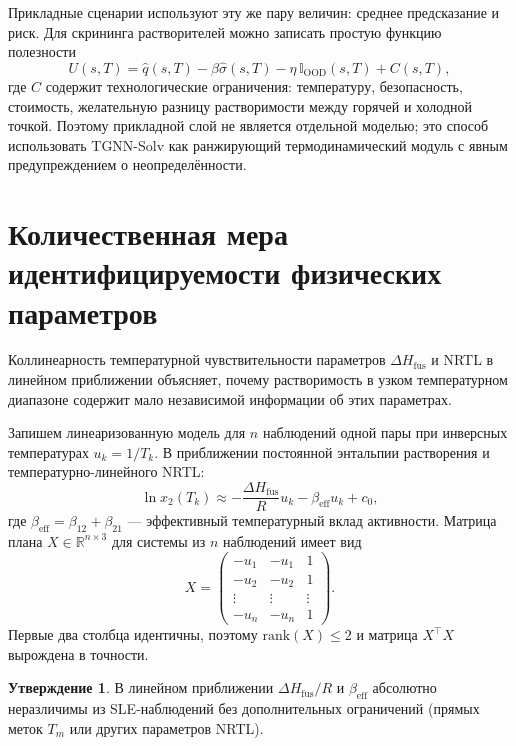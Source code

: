 \documentclass[11pt]{article}
\newcommand{\dHfus}{\Delta H_{\mathrm{fus}}}
\theoremstyle{definition}
\newtheorem{claim}{Утверждение}[section]
\begin{document}
Прикладные сценарии используют эту же пару величин: среднее предсказание и риск. Для скрининга растворителей можно записать простую функцию полезности
\begin{equation*}
    U(s,T)=\hat q(s,T)-\beta\hat\sigma(s,T)-\eta\,\mathbb I_{\mathrm{OOD}}(s,T)+C(s,T),
\end{equation*}
где $C$ содержит технологические ограничения: температуру, безопасность, стоимость, желательную разницу растворимости между горячей и холодной точкой. Поэтому прикладной слой не является отдельной моделью; это способ использовать TGNN-Solv как ранжирующий термодинамический модуль с явным предупреждением о неопределённости.

\section{Количественная мера идентифицируемости физических параметров}
\label{app:identifiability-quantitative}

Коллинеарность температурной чувствительности параметров $\Delta H_{\mathrm{fus}}$ и NRTL в линейном приближении объясняет, почему растворимость в узком температурном диапазоне содержит мало независимой информации об этих параметрах.

Запишем линеаризованную модель для $n$ наблюдений одной пары при инверсных температурах $u_k = 1/T_k$. В приближении постоянной энтальпии растворения и температурно-линейного NRTL:
\begin{equation}
    \ln x_2(T_k) \approx -\frac{\dHfus}{R} u_k - \beta_{\mathrm{eff}} u_k + c_0,
\end{equation}
где $\beta_{\mathrm{eff}} = \beta_{12} + \beta_{21}$ — эффективный температурный вклад активности. Матрица плана $X \in \mathbb R^{n \times 3}$ для системы из $n$ наблюдений имеет вид
\begin{equation*}
    X = \begin{pmatrix} -u_1 & -u_1 & 1 \\ -u_2 & -u_2 & 1 \\ \vdots & \vdots & \vdots \\ -u_n & -u_n & 1 \end{pmatrix}.
\end{equation*}
Первые два столбца идентичны, поэтому $\mathrm{rank}(X) \le 2$ и матрица $X^\top X$ вырождена в точности.

\begin{claim}
В линейном приближении $\dHfus/R$ и $\beta_{\mathrm{eff}}$ абсолютно неразличимы из SLE-наблюдений без дополнительных ограничений (прямых меток $T_m$ или других параметров NRTL).
\end{claim}
\end{document}
